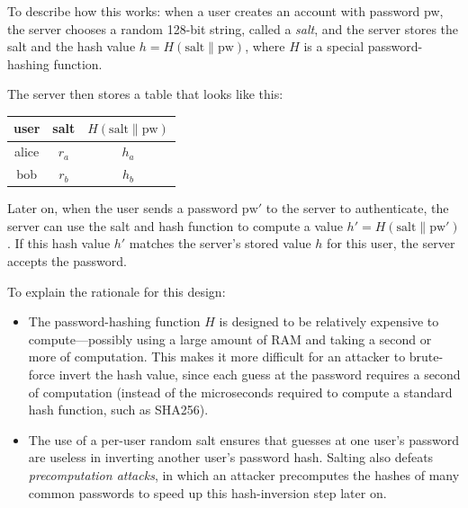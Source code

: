 To describe how this works: when a user creates an account with password pw,
the server chooses a random 128-bit string, called a \emph{salt},
and the server stores the salt and the hash value
$h=H(\text{salt}\|\text{pw})$, where $H$ is a special password-hashing function.

The server then stores a table that looks like this:

\medskip
\begin{tabular}{c|c|c}
  user & salt & $H(\text{salt}\|\text{pw})$ \\
	\hline
	alice & $r_a$ & $h_a$ \\
	bob & $r_b$ & $h_b$ \\
\end{tabular}
\medskip

Later on, when the user sends a password $\text{pw}'$ to the server to authenticate, 
the server can use the salt and hash function to compute a value $h' = H(\text{salt}\|\text{pw}')$.
If this hash value $h'$ matches the server's stored value $h$ for this user,
the server accepts the password.

To explain the rationale for this design:
\begin{itemize}
  \item The password-hashing function $H$ is designed to be relatively expensive
        to compute---possibly using a large amount of RAM and taking a second or 
        more of computation.
        This makes it more difficult for an attacker to brute-force invert the
        hash value, since each guess at the password requires a second of computation
        (instead of the microseconds required to compute a standard hash function,
        such as SHA256).
  \item The use of a per-user random salt ensures that guesses at one user's password
    are useless in inverting another user's password hash.
        Salting also defeats \emph{precomputation attacks}, in which an attacker
        precomputes the hashes of many common passwords to speed up this hash-inversion
        step later on.
\end{itemize}


